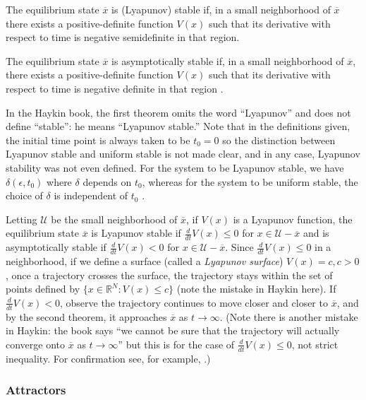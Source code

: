 \begin{theorem}
The equilibrium state $\overline{x}$ is (Lyapunov) stable if, in a small neighborhood of $\overline{x}$ there exists a positive-definite function $V(x)$ such that its derivative with respect to time is negative semidefinite in that region.
\end{theorem}

\begin{theorem}
The equilibrium state $\overline{x}$ is asymptotically stable if, in a small neighborhood of $\overline{x}$, there exists a positive-definite function $V(x)$ such that its derivative with respect to time is negative definite in that region \cite[p. 682]{Haykin:2009:NNC:1213811}.
\end{theorem}

In the Haykin book, the first theorem omits the word ``Lyapunov'' and does not define ``stable'': he means ``Lyapunov stable.'' Note that in the definitions given, the initial time point is always taken to be $t_0 = 0$ so the distinction between Lyapunov stable and uniform stable is not made clear, and in any case, Lyapunov stability was not even defined. For the system to be Lyapunov stable, we have $\delta(\epsilon, t_0)$ where $\delta$ depends on $t_0$, whereas for the system to be uniform stable, the choice of $\delta$ is independent of $t_0$ \cite{byao}.

Letting $\mathcal{U}$ be the small neighborhood of $\overline{x}$, if $V(x)$ is a Lyapunov function, the equilibrium state $\overline{x}$ is Lyapunov stable if $\frac{d}{dt} V(x) \leq 0$ for $x \in \mathcal{U} - \overline{x}$ and is asymptotically stable if $\frac{d}{dt}V(x) < 0$ for $x \in \mathcal{U} - \overline{x}$. Since $\frac{d}{dt} V(x) \leq 0$ in a neighborhood, if we define a surface (called a \emph{Lyapunov surface}) $V(x) = c, c > 0$, once a trajectory crosses the surface, the trajectory stays within the set of points defined by $\{x \in \mathbb{R}^N : V(x) \leq c\}$ (note the mistake in Haykin here). If $\frac{d}{dt}V(x) < 0$, observe the trajectory continues to move closer and closer to $\overline{x}$, and by the second theorem, it approaches $\overline{x}$ as $t \to \infty$. (Note there is another mistake in Haykin: the book says ``we cannot be sure that the trajectory will actually converge onto $\overline{x}$ as $t \to \infty$'' but this is for the case of $\frac{d}{dt} V(x) \leq 0$, not strict inequality. For confirmation see, for example, \citealt[p. 18-19]{christofides2005control}.)

\subsubsection{Attractors}

